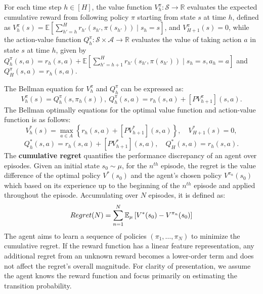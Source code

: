 For each time step $h \in [H]$, the value function $V^\pi_h : \mathcal{S} \rightarrow \mathbb{R}$ evaluates the expected cumulative reward from following policy $\pi$ starting from state $s$ at time $h$, defined as $V^\pi_h(s) = \mathbb{E}\left[\sum_{h'=h}^{H} r_{h'}(s_{h'}, \pi(s_{h'})) \mid s_h = s\right]$, and $V^\pi_{H+1}(s) = 0$, while the action-value function $Q^\pi_h : \mathcal{S} \times \mathcal{A} \rightarrow \mathbb{R}$ evaluates the value of taking action $a$ in state $s$ at time $h$, given by
$Q^\pi_h(s, a) = r_h(s, a) + \mathbb{E}\left[\sum_{h'=h+1}^{H} r_{h'}(s_{h'}, \pi(s_{h'})) \mid s_h = s, a_h = a\right]$ and $Q^\pi_H(s, a) = r_h(s, a).$


The Bellman equation for $V^\pi_h$ and $Q^\pi_h$ can be expressed as:
\[V^\pi_h(s) = Q^\pi_h(s, \pi_h(s)), \ Q^\pi_h(s, a) = r_h(s, a) + [P V^\pi_{h+1}](s, a).\]
The Bellman optimally equations for the optimal value function 
and action-value function is as follows:
$$V^*_h(s) = \max_{a \in A}\left\{r_h(s, a) + [P V^*_{h+1}](s, a)\right\}, \quad V^*_{H+1}(s) = 0,$$
$$Q^*_h(s, a) = r_h(s, a) + [P V^*_{h+1}](s, a), \quad Q^*_H(s, a) = r_h(s, a).$$
The \textbf{cumulative regret} quantifies the performance discrepancy of an agent over episodes. Given an initial state $s_0\sim \mu$, for the $ n^{th} $ episode, the regret is the value difference of the optimal policy $ V^*(s_0) $ and the agent's chosen policy $ V^{\pi_n}(s_0) $ which based on its experience up to the beginning of the $ n^{th}$ episode and applied throughout the episode. Accumulating over $ N $ episodes, it is defined as:
\[Regret(N) = \sum_{n=1}^{N} \mathbb{E}_\mu\left[ V^*(s_0) - V^{\pi_n}(s_0) \right] \]
The agent aims to learn a sequence of policies $ ( \pi_1, \ldots, \pi_N ) $ to minimize the cumulative regret. 
If the reward function has a linear feature representation, any additional regret from an unknown reward becomes a lower-order term and does not affect the regret's overall magnitude. For clarity of presentation, we assume the agent knows the reward function and focus primarily on estimating the transition probability.

